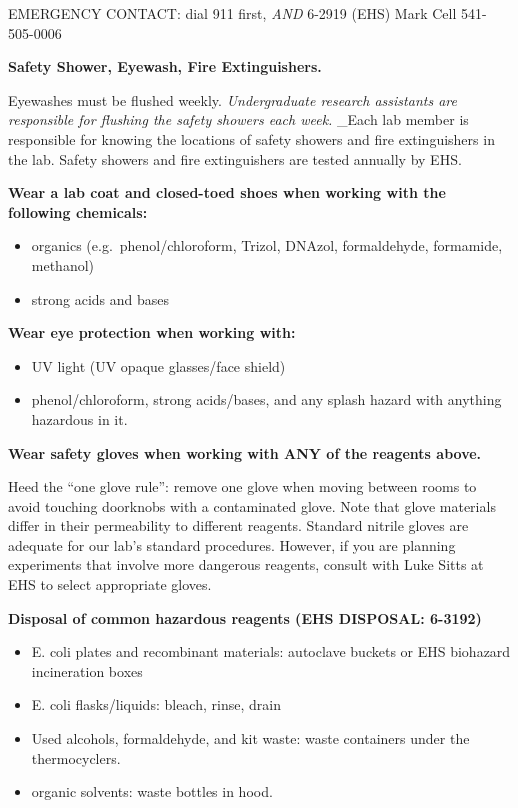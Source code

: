 \documentclass[
]{book}
\providecommand{\tightlist}{%
  \setlength{\itemsep}{0pt}\setlength{\parskip}{0pt}}
\begin{document}
EMERGENCY CONTACT: dial 911 first, \emph{AND} 6-2919 (EHS) \textbar{} Mark Cell 541-505-0006

\textbf{Safety Shower, Eyewash, Fire Extinguishers.}

Eyewashes must be flushed weekly. \emph{Undergraduate research assistants are responsible for flushing the safety showers each week.} \_Each lab member is responsible for knowing the locations of safety showers and fire extinguishers in the lab. Safety showers and fire extinguishers are tested annually by EHS.

\textbf{Wear a lab coat and closed-toed shoes when working with the following chemicals:}

\begin{itemize}
\tightlist
\item
  organics (e.g.~phenol/chloroform, Trizol, DNAzol, formaldehyde, formamide, methanol)
\item
  strong acids and bases
\end{itemize}

\textbf{Wear eye protection when working with:}

\begin{itemize}
\item
  UV light (UV opaque glasses/face shield)
\item
  phenol/chloroform, strong acids/bases, and any splash hazard with anything hazardous in it.
\end{itemize}

\textbf{Wear safety gloves when working with ANY of the reagents above.}

Heed the ``one glove rule'': remove one glove when moving between rooms to avoid touching doorknobs with a contaminated glove. Note that glove materials differ in their permeability to different reagents. Standard nitrile gloves are adequate for our lab's standard procedures. However, if you are planning experiments that involve more dangerous reagents, consult with Luke Sitts at EHS to select appropriate gloves.

\textbf{Disposal of common hazardous reagents (EHS DISPOSAL: 6-3192)}

\begin{itemize}
\item
  E. coli plates and recombinant materials: autoclave buckets or EHS biohazard incineration boxes
\item
  E. coli flasks/liquids: bleach, rinse, drain
\item
  Used alcohols, formaldehyde, and kit waste: waste containers under the thermocyclers.
\item
  organic solvents: waste bottles in hood.
\end{itemize}
\end{document}
